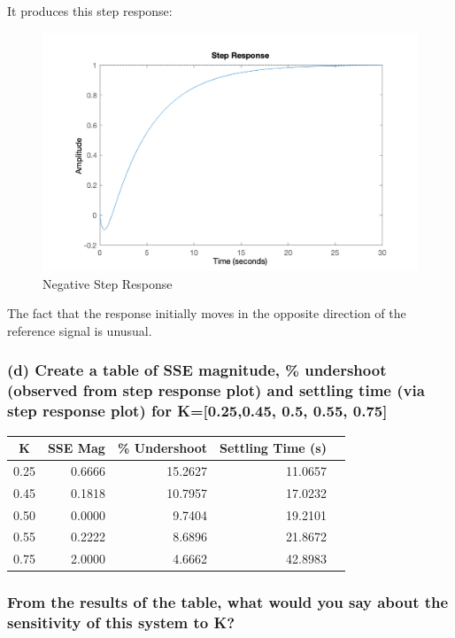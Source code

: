 \documentclass[12pt, letterpaper]{../assignment}
\begin{document}
It produces this step response:
\begin{figure}[H]
    \centering
    \includegraphics[width=0.8\linewidth]{./figures/Q3_Step_Response.png}
    \caption{Negative Step Response}
\end{figure}

The fact that the response initially moves in the opposite direction of the reference signal is unusual.

\subsubsection*{(d) Create a table of SSE magnitude,
\% undershoot (observed from step response plot)
and settling time (via step response plot)
for K=[0.25,0.45, 0.5, 0.55, 0.75]}

\begin{center}
\begin{tabular}{ |c||r|r|r|r| } 
\hline
    K & SSE Mag & \% Undershoot & Settling Time (s) \\
    \hline
    0.25 & 0.6666 & 15.2627 & 11.0657 \\ 
    0.45 & 0.1818 & 10.7957 & 17.0232 \\ 
    0.50 & 0.0000 & 9.7404 & 19.2101 \\ 
    0.55 & 0.2222 & 8.6896 & 21.8672 \\
    0.75 & 2.0000 & 4.6662 & 42.8983 \\
\hline
\end{tabular}
\end{center}

\subsubsection*{From the results of the table,
what would you say about the sensitivity of this system to K?}
\end{document}
